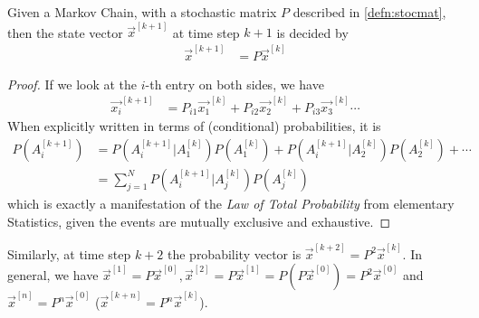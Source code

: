 \begin{proper}
Given a Markov Chain, with a stochastic matrix $P$ described in \ref{defn:stocmat}, then the state vector $\vec{x}^{[k+1]}$ at time step $k+1$ is decided by
\begin{align*}
\vec{x}^{[k+1]} &= P\vec{x}^{[k]}   
\end{align*}
\end{proper}
\begin{proof}
If we look at the $i$-th entry on both sides, we have
\begin{align*}
\vec{x_i}^{[k+1]} &= P_{i1} \vec{x_1}^{[k]} + P_{i2} \vec{x_2}^{[k]} + P_{i3} \vec{x_3}^{[k]} \cdots 
\end{align*}
When explicitly written in terms of (conditional) probabilities, it is
\begin{align*}
P(A_i^{[k+1]}) &= P(A_i^{[k+1]}|A_1^{[k]}) P(A_1^{[k]}) + P(A_i^{[k+1]}|A_2^{[k]}) P(A_2^{[k]}) + \cdots \\
&= \sum_{j=1}^N P(A_i^{[k+1]}|A_j^{[k]}) P(A_j^{[k]})
\end{align*}
which is exactly a manifestation of the \textit{Law of Total Probability} from elementary Statistics, given the events are mutually exclusive and exhaustive.
\end{proof} 
Similarly, at time step $k+2$ the probability vector is $\vec{x}^{[k+2]} = P^2\vec{x}^{[k]}$. In general, we have $\vec{x}^{[1]} = P\vec{x}^{[0]}, \vec{x}^{[2]} = P\vec{x}^{[1]} = P(P\vec{x}^{[0]}) = P^2\vec{x}^{[0]}$ and $\vec{x}^{[n]} = P^n\vec{x}^{[0]}$ ($\vec{x}^{[k+n]} = P^n\vec{x}^{[k]}$).

